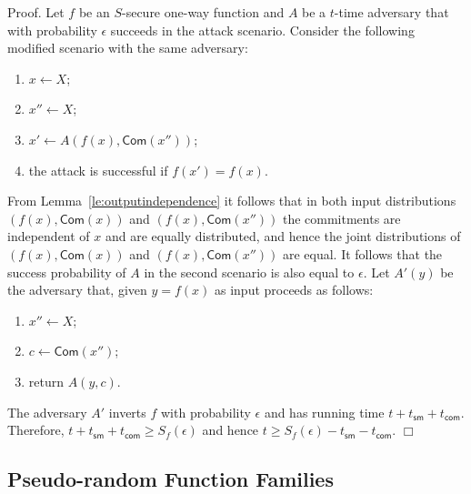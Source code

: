 \documentclass{article}
\newtheorem{lemma}{Lemma}[section]
\newenvironment{proof}{\textsf{Proof}.}{\hfill$\Box$}
\newcommand{\commit}[0]{\mathsf{Com}}
\begin{document}
\begin{proof}
Let $f$ be an $S$-secure one-way function and $A$ be a $t$-time adversary that with probability $\epsilon$ succeeds in the attack scenario.
Consider the following modified scenario with the same adversary:
\begin{enumerate}
\item $x\gets X$;
\item $x''\gets X$;
\item $x'\gets A(f(x),\commit(x''))$;
\item the attack is successful if $f(x')=f(x)$.
\end{enumerate}

\noindent From Lemma~\ref{le:outputindependence} it follows that in both input distributions $(f(x),\commit(x))$ and $(f(x),\commit(x''))$ the commitments are independent of $x$ and are equally distributed, and hence
the joint distributions of $(f(x),\commit(x))$ and $(f(x),\commit(x''))$ are equal. It follows that the success probability of $A$ in the second scenario is also equal to $\epsilon$. Let $A'(y)$ be the adversary that, given $y=f(x)$ as input proceeds as follows:
\begin{enumerate}
\item $x''\gets X$;
\item $c\gets \commit(x'')$;
\item return $A(y,c)$.
\end{enumerate}

\noindent The adversary $A'$ inverts $f$ with probability $\epsilon$ and has running time $t+t_\mathsf{sm} + t_\mathsf{com}$. Therefore, $t+t_\mathsf{sm} + t_\mathsf{com}\ge S_f(\epsilon)$ and hence $t\ge S_f(\epsilon)- t_\mathsf{sm} - t_\mathsf{com}$.
\end{proof}
\medskip


\subsection{Pseudo-random Function Families}
\end{document}
